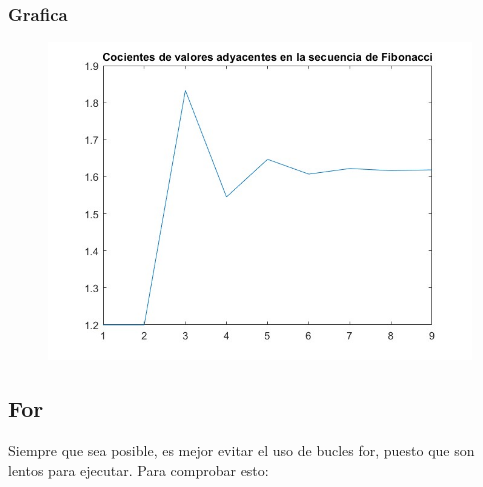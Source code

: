 \documentclass{article}
\begin{document}
	\subsubsection{Grafica}
	
	\begin{figure}[h]
		\centering
		\includegraphics[width=\textwidth]{Grafica9.jpg}
	\end{figure}
	
	\newpage
	
	\subsection{For}
	
	Siempre que sea posible, es mejor evitar el uso de bucles for, puesto que son lentos para ejecutar. Para comprobar esto:
	
\end{document}
